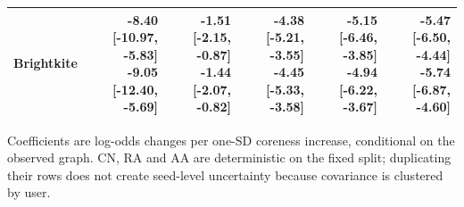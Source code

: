 \begin{table}[t]
\begin{tabular}{lrrrrr}
Brightkite & \shortstack{-8.40 [-10.97, -5.83]\\-9.05 [-12.40, -5.69]} & \shortstack{-1.51 [-2.15, -0.87]\\-1.44 [-2.07, -0.82]} & \shortstack{-4.38 [-5.21, -3.55]\\-4.45 [-5.33, -3.58]} & \shortstack{-5.15 [-6.46, -3.85]\\-4.94 [-6.22, -3.67]} & \shortstack{-5.47 [-6.50, -4.44]\\-5.74 [-6.87, -4.60]} \\
\bottomrule
\end{tabular}
\par\footnotesize Coefficients are log-odds changes per one-SD coreness increase, conditional on the observed graph. CN, RA and AA are deterministic on the fixed split; duplicating their rows does not create seed-level uncertainty because covariance is clustered by user.
\end{table}
